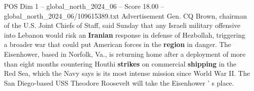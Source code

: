 \begin{textsample}{POS Dim 1 – global\_north\_2024\_06 – Score 18.00 – global\_north\_2024\_06/109615389.txt}
Advertisement Gen.
CQ Brown, chairman of the U.S.
Joint Chiefs of Staff, said Sunday that any Israeli military offensive into Lebanon would risk an \textbf{Iranian} response in defense of Hezbollah, triggering a broader war that could put American forces in the \textbf{region} in danger.
The Eisenhower, based in Norfolk, Va., is returning home after a deployment of more than eight months countering Houthi \textbf{strikes} on commercial \textbf{shipping} in the Red Sea, which the Navy says is its most intense mission since World War II.
The San Diego-based USS Theodore Roosevelt will take the Eisenhower ' s place.

\end{textsample}
